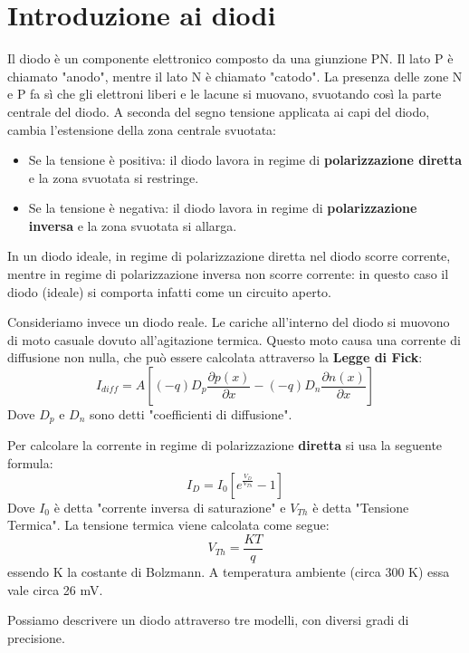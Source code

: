 \documentclass[\main/main.tex]{subfiles}
\begin{document}
\section{Introduzione ai diodi}

Il diodo è un componente elettronico composto da una giunzione PN. 
Il lato P è chiamato "anodo", mentre il lato N è chiamato "catodo". 
La presenza delle zone N e P fa sì che gli elettroni liberi e le lacune si muovano, svuotando così la parte centrale del diodo. 
A seconda del segno tensione applicata ai capi del diodo, cambia l'estensione della zona centrale svuotata: 
\begin{itemize} 
    \item Se la tensione è positiva: il diodo lavora in regime di \textbf{polarizzazione diretta} e la zona svuotata si restringe.  
	\item Se la tensione è negativa: il diodo lavora in regime di \textbf{polarizzazione inversa} e la zona svuotata si allarga.  
\end{itemize}
In un diodo ideale, in regime di polarizzazione diretta nel diodo scorre corrente, mentre in regime di polarizzazione inversa non scorre corrente: in questo caso il diodo (ideale) si comporta infatti come un circuito aperto. 

Consideriamo invece un diodo reale. 
Le cariche all'interno del diodo si muovono di moto casuale dovuto all'agitazione termica. Questo moto causa una corrente di diffusione non nulla, che può essere calcolata attraverso la \textbf{Legge di Fick}:
\[I_{diff} = A \left[(-q)D_p\frac{\partial p(x)}{\partial x} - (-q)D_n\frac{\partial n(x)}{\partial x} \right]\]
Dove  $D_{p}$ e  $D_{n} $ sono detti "coefficienti di diffusione".

Per calcolare la corrente in regime di polarizzazione \textbf{diretta} si usa la seguente formula:
\[I_D = I_0 \left[e^{\frac{V_D}{V_{Th}}}-1 \right]\]
Dove  $I_0$ è detta "corrente inversa di saturazione" e  $V_{Th} $ è detta "Tensione Termica".
La tensione termica viene calcolata come segue:
\[V_{Th} = \frac{KT}{q}\]
essendo K la costante di Bolzmann. A temperatura ambiente (circa 300 K) essa vale circa 26 mV.

Possiamo descrivere un diodo attraverso tre modelli, con diversi gradi di precisione.
\end{document}
